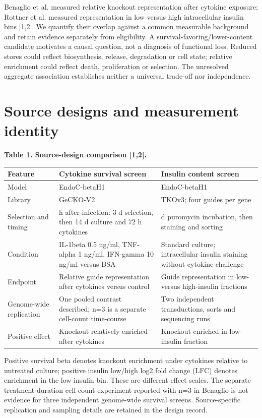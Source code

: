 \documentclass[10pt,letterpaper]{article}
\begin{document}
Benaglio et al. measured relative knockout representation after cytokine exposure; Rottner et al. measured representation in low versus high intracellular insulin bins [1,2]. We quantify their overlap against a common measurable background and retain evidence separately from eligibility. A survival-favoring/lower-content candidate motivates a causal question, not a diagnosis of functional loss. Reduced stores could reflect biosynthesis, release, degradation or cell state; relative enrichment could reflect death, proliferation or selection. The unresolved aggregate association establishes neither a universal trade-off nor independence.

\clearpage
\section*{Source designs and measurement identity}
{\small\textbf{Table 1. Source-design comparison [1,2].}\par}
{\small\begin{longtable}{>{\raggedright\arraybackslash}p{0.96in}>{\raggedright\arraybackslash}p{2.46in}>{\raggedright\arraybackslash}p{2.50in}}\toprule
\textbf{Feature} & \textbf{Cytokine survival screen} & \textbf{Insulin content screen}\\\midrule\endhead
Model & EndoC-betaH1 & EndoC-betaH1\\
Library & GeCKO-V2 & TKOv3; four guides per gene\\
Selection and timing & 48 h after infection: 3 d selection, then 14 d culture and 72 h cytokines & 7 d puromycin incubation, then staining and sorting\\
Condition & IL-1beta 0.5 ng/ml, TNF-alpha 1 ng/ml, IFN-gamma 10 ng/ml versus BSA & Standard culture; intracellular insulin staining without cytokine challenge\\
Endpoint & Relative guide representation after cytokines versus control & Guide representation in low- versus high-insulin fractions\\
Genome-wide replication & One pooled contrast described; n=3 is a separate cell-count time-course & Two independent transductions, sorts and sequencing runs\\
Positive effect & Knockout relatively enriched after cytokines & Knockout enriched in low-insulin fraction\\
\bottomrule\end{longtable}}
Positive survival beta denotes knockout enrichment under cytokines relative to untreated culture; positive insulin low/high log2 fold change (LFC) denotes enrichment in the low-insulin bin. These are different effect scales. The separate treatment-duration cell-count experiment reported with n=3 in Benaglio is not evidence for three independent genome-wide survival screens. Source-specific replication and sampling details are retained in the design record.
\end{document}
